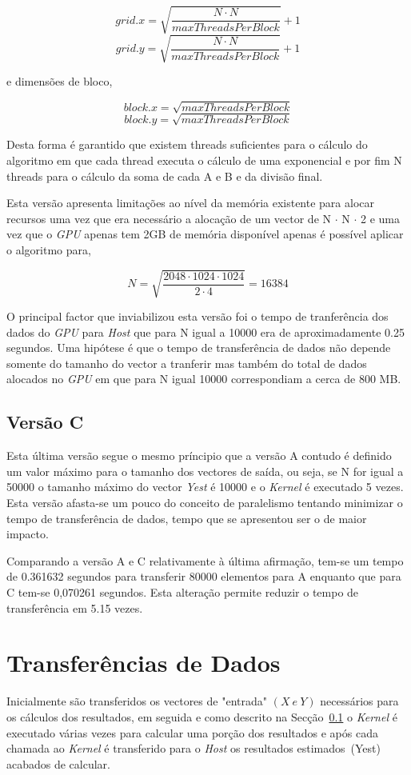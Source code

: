 \[grid.x = \sqrt{\frac{N\cdot N}{maxThreadsPerBlock}} + 1\]
\[grid.y = \sqrt{\frac{N\cdot N}{maxThreadsPerBlock}} + 1\]

e dimensões de bloco,

\[block.x = \sqrt{maxThreadsPerBlock}\]
\[block.y = \sqrt{maxThreadsPerBlock}\]

Desta forma é garantido que existem threads suficientes para o cálculo do algoritmo em que cada thread executa o cálculo de uma exponencial e por fim N threads para o cálculo da soma de cada A e B e da divisão final.

Esta versão apresenta limitações ao nível da memória existente para alocar recursos uma vez que era necessário a alocação de um vector de N $\cdot$ N $\cdot$ 2 e uma vez que o \textit{GPU} apenas tem 2GB de memória disponível apenas é possível aplicar o algoritmo para, 

\[N = \sqrt{\frac{2048\cdot 1024\cdot 1024}{2\cdot 4}} = 16384\]

O principal factor que inviabilizou esta versão foi o tempo de tranferência dos dados do \textit{GPU} para \textit{Host} que para N igual a 10000 era de aproximadamente 0.25 segundos. Uma hipótese é que o tempo de transferência de dados não depende somente do tamanho do vector a tranferir mas também do total de dados alocados no \textit{GPU} em que para N igual 10000 correspondiam a cerca de 800 MB.

\subsection{Versão C}
\label{sec:kernel}
Esta última versão segue o mesmo príncipio que a versão A contudo é definido um valor máximo para o tamanho dos vectores de saída, ou seja, se N for igual a 50000 o tamanho máximo do vector \textit{Yest} é 10000 e o \textit{Kernel} é executado 5 vezes. Esta versão afasta-se um pouco do conceito de paralelismo tentando minimizar o tempo de transferência de dados, tempo que se apresentou ser o de maior impacto.

Comparando a versão A e C relativamente à última afirmação, tem-se um tempo de 0.361632 segundos para transferir 80000 elementos para A enquanto que para C tem-se 0,070261 segundos. Esta alteração permite reduzir o tempo de transferência em 5.15 vezes.


\section{Transferências de Dados}
Inicialmente são transferidos os vectores de "entrada" \mbox{$(X\ e\ Y)$} necessários para os cálculos dos resultados, em seguida e como descrito na Secção~\ref{sec:kernel} o \textit{Kernel} é executado várias vezes para calcular uma porção dos resultados e após cada chamada ao \textit{Kernel} é transferido para o \textit{Host} os resultados estimados~(Yest) acabados de calcular.

